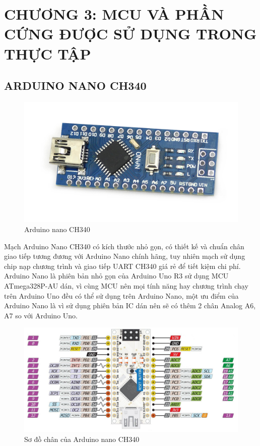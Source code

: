 \section*{CHƯƠNG 3: MCU VÀ PHẦN CỨNG ĐƯỢC SỬ DỤNG TRONG THỰC TẬP}
\setcounter{section}{3}
\setcounter{figure}{0}
\setcounter{subsection}{0}
\subsection{ARDUINO NANO CH340}
\begin{figure}[H]
	\centering
	\includegraphics[scale=0.15]{Chapter 3/image chapter 3/nano.jpg}
	\caption[Arduino nano CH340]{Arduino nano CH340}
	\label{hinh31}
\end{figure}
Mạch Arduino Nano CH340 có kích thước nhỏ gọn, có thiết kế và chuẩn chân giao tiếp tương đương với Arduino Nano chính hãng, tuy nhiên mạch sử dụng chip nạp chương trình và giao tiếp UART CH340 giá rẻ để tiết kiệm chi phí.\\
\indent Arduino Nano là phiên bản nhỏ gọn của Arduino Uno R3 sử dụng MCU ATmega328P-AU dán, vì cùng MCU nên mọi tính năng hay chương trình chạy trên Arduino Uno đều có thể sử dụng trên Arduino Nano, một ưu điểm của Arduino Nano là vì sử dụng phiên bản IC dán nên sẽ có thêm 2 chân Analog A6, A7 so với Arduino Uno.\\
\begin{figure}[H]
	\centering
	\includegraphics[scale=.7]{Chapter 3/image chapter 3/sodoNano.png}
	\caption[Sơ đồ chân của Arduino nano CH340]{Sơ đồ chân của Arduino nano CH340}
	\label{hinh32}
\end{figure}
